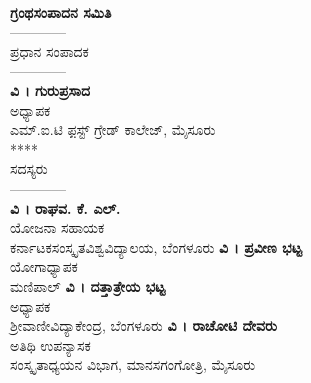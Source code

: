 \thispagestyle{empty}
~
\vfill
\noindent
\begin{center}
\fboxsep=20pt
{}
\end{center}
\vfill
\eject
\thispagestyle{empty}
\begin{center}

{\huge\bfseries ಗ್ರಂಥಸಂಪಾದನ ಸಮಿತಿ}\\
––––––––\\
\vfill
ಪ್ರಧಾನ ಸಂಪಾದಕ\\
––––––––\\
{\Large\bfseries ವಿ । ಗುರುಪ್ರಸಾದ}\\
ಅಧ್ಯಾಪಕ\\
ಎಮ್.ಐ.ಟಿ ಫ಼ಸ್ಟ್ ಗ್ರೇಡ್ ಕಾಲೇಜ್, ಮೈಸೂರು  \\
****\\
\vfill
ಸದಸ್ಯರು\\
––––––––\\
{\Large\bfseries ವಿ । ರಾಘವ. ಕೆ. ಎಲ್.}\\
ಯೋಜನಾ ಸಹಾಯಕ\\
ಕರ್ನಾಟಕಸಂಸ್ಕೃತವಿಶ್ವವಿದ್ಯಾಲಯ, ಬೆಂಗಳೂರು
\vfill
{\Large\bfseries ವಿ । ಪ್ರವೀಣ ಭಟ್ಟ}\\
ಯೋಗಾಧ್ಯಾಪಕ\\
ಮಣಿಪಾಲ್
\vfill
{\Large\bfseries ವಿ । ದತ್ತಾತ್ರೇಯ ಭಟ್ಟ}\\
ಅಧ್ಯಾಪಕ\\
ಶ್ರೀವಾಣೀವಿದ್ಯಾಕೇಂದ್ರ, ಬೆಂಗಳೂರು
\vfill
{\Large\bfseries ವಿ । ರಾಚೋಟಿ ದೇವರು}\\
ಅತಿಥಿ ಉಪನ್ಯಾಸಕ\\
ಸಂಸ್ಕೃತಾಧ್ಯಯನ ವಿಭಾಗ, ಮಾನಸಗಂಗೋತ್ರಿ, ಮೈಸೂರು

\end{center}
